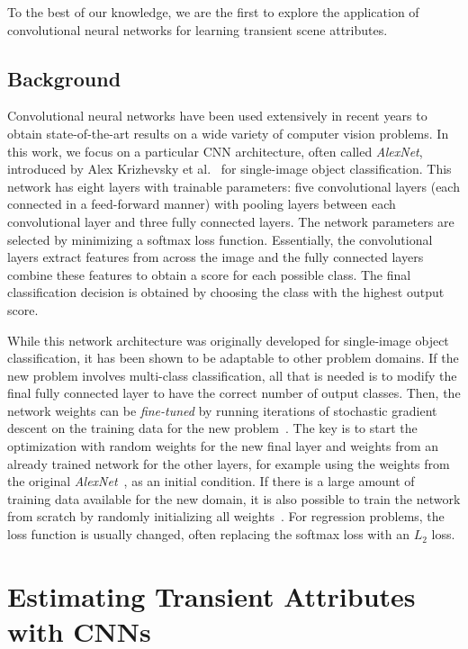\documentclass[10pt,twocolumn,letterpaper]{article}
\begin{document}
To the best of our knowledge, we are the first to explore the application of
convolutional neural networks for learning transient scene attributes.

\subsection{Background}

Convolutional neural networks have been used extensively in recent years to
obtain state-of-the-art results on a wide variety of computer vision problems.
In this work, we focus on a particular CNN architecture, often called {\em
AlexNet}, introduced by Alex Krizhevsky et al.~\cite{caffenetnips12} for
single-image object classification. This network has eight layers with
trainable parameters: five convolutional layers (each connected in a
feed-forward manner) with pooling layers between each convolutional layer and
three fully connected layers. The network parameters are selected by minimizing
a softmax loss function. Essentially, the convolutional layers extract features
from across the image and the fully connected layers combine these features to
obtain a score for each possible class. The final classification decision is
obtained by choosing the class with the highest output score.  

While this network architecture was originally developed for single-image
object classification, it has been shown to be adaptable to other problem
domains. If the new problem involves multi-class classification, all that is
needed is to modify the final fully connected layer to have the correct number
of output classes. Then, the network weights can be {\em fine-tuned} by running
iterations of stochastic gradient descent on the training data for the new
problem~\cite{yosinski2014transferable}.  The key is to start the optimization
with random weights for the new final layer and weights from an already trained
network for the other layers, for example using the weights from the original
\emph{AlexNet}~\cite{caffenetnips12}, as an initial condition. If there is a large
amount of training data available for the new domain, it is also possible to
train the network from scratch by randomly initializing all
weights~\cite{zhou2014places}.  For regression problems, the loss
function is usually changed, often replacing the softmax loss with an
$L_2$ loss.

\section{Estimating Transient Attributes with CNNs}
\label{sec:method}
\end{document}
